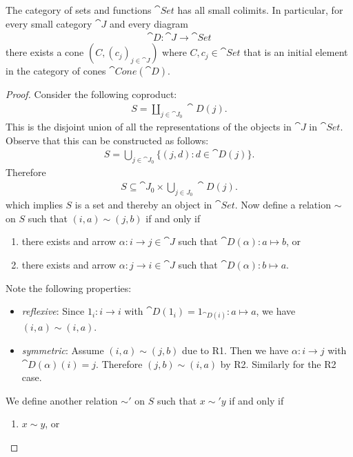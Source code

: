 \documentclass{article}
\begin{document}
\begin{claim*}
	The category of sets and functions $\cat{Set}$ has all small colimits.
	In particular, for every small category $\cat J$ and every diagram
	\begin{align*}
		\cat D : \cat J \to \cat{Set}
	\end{align*}
	there exists a cone $(C, (c_j)_{j\in\cat J})$ where $C,c_j\in\cat{Set}$
	that is an initial element in the category of cones $\cat{Cone}(\cat D)$.
\end{claim*}

\begin{proof}
	Consider the following coproduct:
	\begin{align*}
		S = \coprod_{j\in\cat J_0} \cat D(j).
	\end{align*}
	This is the disjoint union of all the representations of the objects in $\cat J$
	in $\cat{Set}$. Observe that this can be constructed as follows:
	\begin{align*}
		S = \bigcup_{j\in\cat J_0}\{(j, d) : d \in \cat D(j)\}.
	\end{align*}
	Therefore
	\begin{align*}
		S \subseteq \cat J_0 \times \bigcup_{j\in J_0} \cat D(j).
	\end{align*}
	which implies $S$ is a set and thereby an object in $\cat{Set}$.
	Now define a relation $\sim$ on $S$
	such that $(i,a)\sim (j,b)$ if and only if
	\begin{enumerate}[label=R\arabic*.]
		\item there exists and arrow $\alpha:i\to j\in\cat J$ such that $\cat D(\alpha): a \mapsto b$, or
		\item there exists and arrow $\alpha:j\to i\in\cat J$ such that $\cat D(\alpha): b \mapsto a$.
	\end{enumerate}
	Note the following properties:
	\begin{itemize}
		\item \emph{reflexive}: Since $1_i:i\to i$ with $\cat D(1_i)=1_{\cat D(i)}:a\mapsto a$, we have $(i,a)\sim(i,a)$.
		\item \emph{symmetric}: Assume $(i,a)\sim(j,b)$ due to R1. Then we have $\alpha:i\to j$ with $\cat D(\alpha)(i) = j$.
		      Therefore $(j,b)\sim (i,a)$ by R2. Similarly for the R2 case.
	\end{itemize}
	We define another relation $\sim'$ on $S$ such that $x\sim'y$ if and only if
	\begin{enumerate}[label=E\arabic*.]
		\item $x\sim y$, or

\end{enumerate}
\end{proof}
\end{document}
